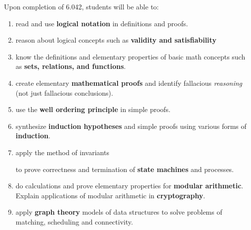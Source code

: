 \documentclass[handout]{mcs}
\begin{document}
Upon completion of 6.042, students will be able to:
\begin{enumerate}

\item \label{basic} read and use \textbf{logical notation} in
  definitions and proofs. \hfill \brule{0.5in}

\item \label{logic} reason about logical
  concepts such as \textbf{validity and satisfiability} \hfill \brule{0.5in}

\item \label{sets} know the definitions and elementary properties of
  basic math concepts such as \textbf{sets, relations, and
    functions}. \hfill \brule{0.5in}


\item \label{proofs} create elementary \textbf{mathematical
proofs} and identify fallacious \emph{reasoning} (not just fallacious
conclusions).  \hfill \brule{0.5in}

\item \label{well ordering principle} use the \textbf{well ordering
  principle} in simple proofs.  \hfill \brule{0.5in}

\item \label{induction} synthesize \textbf{induction hypotheses} and
  simple proofs using various forms of \textbf{induction}.  \hfill
  \brule{0.5in}

\item \label{invariants} apply the method of invariants
\iffalse and well-ordering\fi
to prove correctness and termination of \textbf{state
    machines} and processes.  \hfill \brule{0.5in}

\iffalse

\item \label{structural induction} find simple proofs using
  \textbf{structural induction}.  \hfill \brule{0.5in}
\fi

\item \label{arithmetic} do calculations and prove elementary
  properties for \textbf{modular arithmetic}.  Explain applications of
  modular arithmetic \iffalse in Computer Science, for example\fi in
  \textbf{cryptography}\iffalse or hashing\fi.\hfill \brule{0.5in}

\item \label{graphs} apply \textbf{graph theory} models of data
  structures to solve problems of matching, scheduling and
  connectivity.  \hfill \brule{0.5in}


\end{enumerate}
\end{document}
